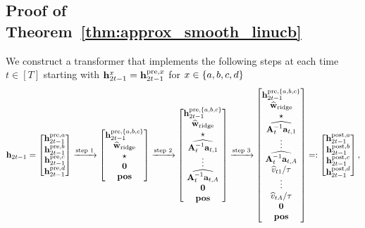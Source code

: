 \subsection{Proof of Theorem~\ref{thm:approx_smooth_linucb}}\label{sec:pf_thm:approx_smooth_linucb}
We construct a transformer that implements the following steps at each time $t\in[T]$ starting with ${\mathbf h}^{x}_{2t-1}={\mathbf h}^{{\mathrm{pre}},x}_{2t-1}$ for $x\in\{{a},{b},{c},{d}\}$
\begin{align}
    {\mathbf h}_{2t-1}=
    \begin{bmatrix}
    {\mathbf h}_{2t-1}^{{\mathrm{pre}},{a}} \\  {\mathbf h}_{2t-1}^{{\mathrm{pre}},{b}}\\  {\mathbf h}_{2t-1}^{{\mathrm{pre}},{c}}\\   {\mathbf h}_{2t-1}^{{\mathrm{pre}},{d}}
\end{bmatrix}
\xrightarrow{\text{step 1}}
   \begin{bmatrix}
    {\mathbf h}_{2t-1}^{{\mathrm{pre}},\{{a},{b},{c}\}} \\
        \widehat{{\mathbf w}}_{{\rm ridge}} \\ \star\\ {\mathbf 0} \\{\mathbf{pos}}
\end{bmatrix}
\xrightarrow{\text{step 2}}
\begin{bmatrix}
    {\mathbf h}_{2t-1}^{{\mathrm{pre}},\{{a},{b},{c}\}} \\
        \widehat{{\mathbf w}}_{{\rm ridge}} \\ \star\\ \widehat{{\mathbf A}_t^{-1}{\mathbf a}_{t,1}}\\\vdots\\\widehat{{\mathbf A}_t^{-1}{\mathbf a}_{t,A}}
        \\ {\mathbf 0} \\{\mathbf{pos}}
\end{bmatrix}
\xrightarrow{\text{step 3}}
\begin{bmatrix}
    {\mathbf h}_{2t-1}^{{\mathrm{pre}},\{{a},{b},{c}\}} \\
        \widehat{{\mathbf w}}_{{\rm ridge}} \\ \star\\ \widehat{{\mathbf A}_t^{-1}{\mathbf a}_{t,1}}\\\vdots\\\widehat{{\mathbf A}_t^{-1}{\mathbf a}_{t,A}}\\ {\widehat v_{t1}}/{{\tau}}\\\vdots\\ {\widehat v_{tA}}/{{\tau}}
        \\ {\mathbf 0} \\{\mathbf{pos}}
\end{bmatrix}
=:
\begin{bmatrix}
    {\mathbf h}_{2t-1}^{{\mathrm{post}},{a}} \\  {\mathbf h}_{2t-1}^{{\mathrm{post}},{b}}\\  {\mathbf h}_{2t-1}^{{\mathrm{post}},{c}}\\   {\mathbf h}_{2t-1}^{{\mathrm{post}},{d}}
\end{bmatrix},\label{eq:slinucb_pipeline}
\end{align}
